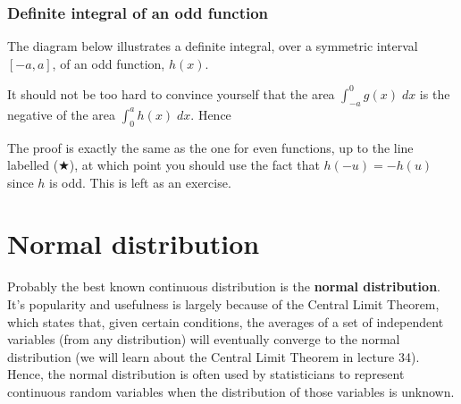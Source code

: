 \subsubsection{Definite integral of an odd function}
The diagram below illustrates a definite integral, over a symmetric interval $[-a,a]$, of an odd function, $h(x)$.
\begin{center}
\end{center}

\noindent It should not be too hard to convince yourself that the area $\int_{-a}^0 g(x) \; dx$ is the negative of the area  $\int_{0}^a h(x) \; dx$. Hence

  	\bigskip
	
	\hfil{}
	\bigskip

\noindent The proof is exactly the same as the one for even functions, up to the line labelled ($\bigstar$), at which point you should use the fact that $h(-u) = -h(u)$ since $h$ is odd. This is left as an exercise. 




\section{Normal distribution} \label{normal distribution}
Probably the best known continuous distribution is the \textbf{normal distribution}. It's popularity and usefulness is largely because of the Central Limit Theorem, which states that, given certain conditions, the averages of a set of independent variables (from any distribution) will eventually converge to the normal distribution (we will learn about the Central Limit Theorem in lecture 34). Hence, the normal distribution is often used by statisticians to represent continuous random variables when the distribution of those variables is unknown. \\

